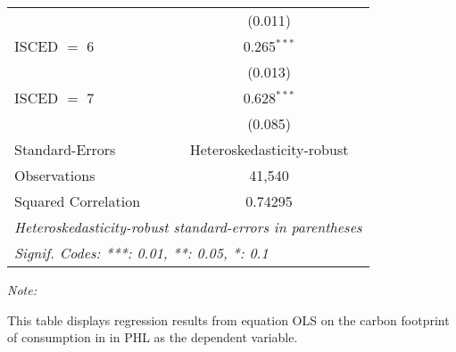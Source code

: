 \begin{table}[htbp!]
\begin{adjustbox}{width = 1\textwidth, max height = 0.95\textheight, center}
\begin{threeparttable}[b]
\begin{tabular}{lc}
                                & (0.011)\\   
            ISCED $=$ 6         & 0.265$^{***}$\\   
                                & (0.013)\\   
            ISCED $=$ 7         & 0.628$^{***}$\\   
                                & (0.085)\\   
            \midrule 
            Standard-Errors     & Heteroskedasticity-robust \\   
            Observations        & 41,540\\  
            Squared Correlation & 0.74295\\  
            \midrule \midrule
            \multicolumn{2}{l}{\emph{Heteroskedasticity-robust standard-errors in parentheses}}\\
            \multicolumn{2}{l}{\emph{Signif. Codes: ***: 0.01, **: 0.05, *: 0.1}}\\
         \end{tabular}
         
         \begin{tablenotes}\item \medskip \textit{Note:}
            \item This table displays regression results from equation OLS on the carbon footprint of consumption in  in PHL as the dependent variable.  
         \end{tablenotes}
      \end{threeparttable}
   \end{adjustbox}
\end{table}


